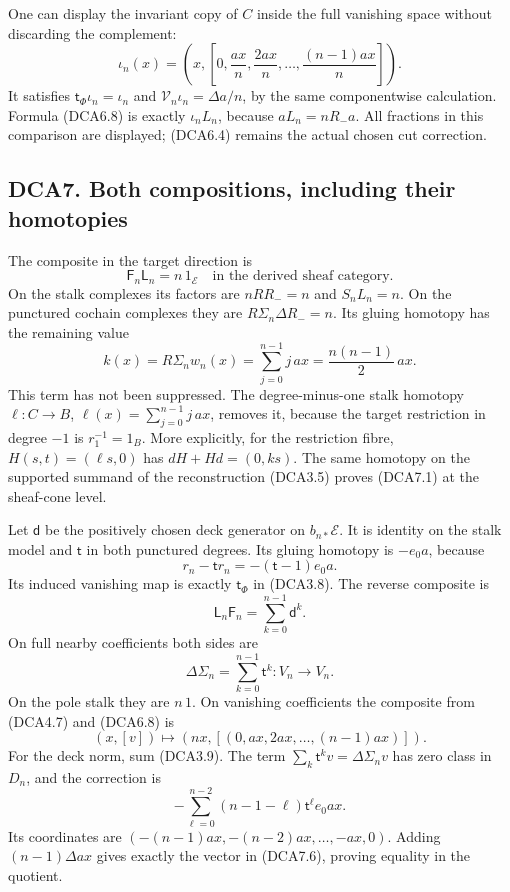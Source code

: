 One can display the invariant copy of \(C\) inside the full vanishing
space without discarding the complement: \[
\iota_n(x)=\left(x,\left[
0,\frac{ax}{n},\frac{2ax}{n},\ldots,\frac{(n-1)ax}{n}
\right]\right).
\tag{DCA6.12}
\] It satisfies \(\mathsf t_\Phi\iota_n=\iota_n\) and
\(\mathcal V_n\iota_n=\Delta a/n\), by the same componentwise
calculation. Formula (DCA6.8) is exactly \(\iota_nL_n\), because
\(aL_n=nR_-a\). All fractions in this comparison are displayed; (DCA6.4)
remains the actual chosen cut correction.

\subsection{DCA7. Both compositions, including their
homotopies}\label{dca7.-both-compositions-including-their-homotopies}

The composite in the target direction is \[
\boxed{\mathsf F_n\mathsf L_n=n\,1_{\mathscr E}}
\quad\text{in the derived sheaf category}.
\tag{DCA7.1}
\] On the stalk complexes its factors are \(nRR_-=n\) and \(S_nL_n=n\).
On the punctured cochain complexes they are \(R\Sigma_n\Delta R_-=n\).
Its gluing homotopy has the remaining value \[
k(x)=R\Sigma_nw_n(x)
=\sum_{j=0}^{n-1}j\,ax
=\frac{n(n-1)}2\,ax.
\tag{DCA7.2}
\] This term has not been suppressed. The degree-minus-one stalk
homotopy \(\ell:C\to B\), \(\ell(x)=\sum_{j=0}^{n-1}j\,ax\), removes it,
because the target restriction in degree \(-1\) is \(r_1^{-1}=1_B\).
More explicitly, for the restriction fibre, \(H(s,t)=(\ell s,0)\) has
\(dH+Hd=(0,ks)\). The same homotopy on the supported summand of the
reconstruction (DCA3.5) proves (DCA7.1) at the sheaf-cone level.

Let \(\mathsf d\) be the positively chosen deck generator on
\(b_{n*}\mathscr E\). It is identity on the stalk model and
\(\mathsf t\) in both punctured degrees. Its gluing homotopy is
\(-e_0a\), because \[
r_n-\mathsf t r_n=-(\mathsf t-1)e_0a.
\tag{DCA7.3}
\] Its induced vanishing map is exactly \(\mathsf t_\Phi\) in (DCA3.8).
The reverse composite is \[
\boxed{\mathsf L_n\mathsf F_n
=\sum_{k=0}^{n-1}\mathsf d^{k}.}
\tag{DCA7.4}
\] On full nearby coefficients both sides are \[
\Delta\Sigma_n=\sum_{k=0}^{n-1}\mathsf t^k:V_n\to V_n.
\tag{DCA7.5}
\] On the pole stalk they are \(n\,1\). On vanishing coefficients the
composite from (DCA4.7) and (DCA6.8) is \[
(x,[v])\longmapsto
\left(nx,\left[(0,ax,2ax,\ldots,(n-1)ax)\right]\right).
\tag{DCA7.6}
\] For the deck norm, sum (DCA3.9). The term
\(\sum_k\mathsf t^kv=\Delta\Sigma_nv\) has zero class in \(D_n\), and
the correction is \[
-\sum_{\ell=0}^{n-2}(n-1-\ell)\mathsf t^\ell e_0ax.
\tag{DCA7.7}
\] Its coordinates are \((-(n-1)ax,-(n-2)ax,\ldots,-ax,0)\). Adding
\((n-1)\Delta ax\) gives exactly the vector in (DCA7.6), proving
equality in the quotient.

